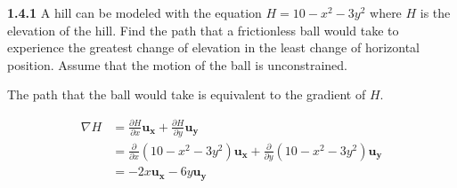 \documentclass{article}
\begin{document}
\textbf{1.4.1} A hill can be modeled with the equation $H = 10 - x^2 - 3y^2$ where $H$ is the elevation of the hill.
Find the path that a frictionless ball would take to experience the greatest change of elevation in the least change of
horizontal position. Assume that the motion of the ball is unconstrained.

\vspace{24pt}

The path that the ball would take is equivalent to the gradient of $H$.

\begin{equation*}
	\begin{split}
		\nabla H & = \frac{\partial H}{\partial x}\mathbf{u_x} + \frac{\partial H}{\partial y}\mathbf{u_y} \\
		& = \frac{\partial}{\partial x}(10 - x^2 - 3y^2)\mathbf{u_x} + \frac{\partial}{\partial y}(10 - x^2 - 3y^2)\mathbf{u_y} \\
		& = -2x\mathbf{u_x} - 6y\mathbf{u_y}
	\end{split}
\end{equation*}
\end{document}
